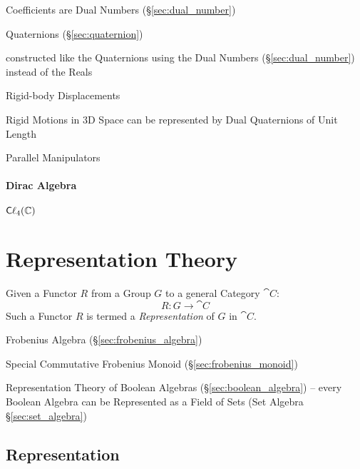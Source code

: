 {{Coefficients are Dual Numbers (\S\ref{sec:dual_number})

\fist Quaternions (\S\ref{sec:quaternion})

constructed like the Quaternions using the Dual Numbers
(\S\ref{sec:dual_number}) instead of the Reals

Rigid-body Displacements

Rigid Motions in 3D Space can be represented by Dual Quaternions of Unit Length

Parallel Manipulators



\paragraph{Dirac Algebra}\label{sec:dirac_algebra}\hfill

$\mathsf{C}\ell_4(\mathbb{C})$



\section{Representation Theory}\label{sec:representation_theory}


Given a Functor $R$ from a Group $G$ to a general Category
$\cat{C}$:
\[
    R : G \rightarrow \cat{C}
\]
Such a Functor $R$ is termed a \emph{Representation} of $G$ in
$\cat{C}$.

Frobenius Algebra (\S\ref{sec:frobenius_algebra})

Special Commutative Frobenius Monoid (\S\ref{sec:frobenius_monoid})

Representation Theory of Boolean Algebras (\S\ref{sec:boolean_algebra}) -- every
Boolean Algebra can be Represented as a Field of Sets (Set Algebra
\S\ref{sec:set_algebra})



\subsection{Representation}\label{sec:representation}

}}
